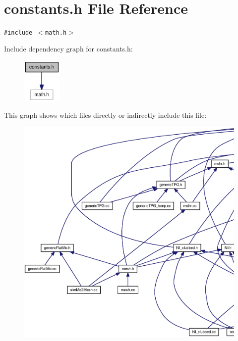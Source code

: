 \section{constants.h File Reference}
\label{constants_8h}
{\tt \#include $<$math.h$>$}\par


Include dependency graph for constants.h:\nopagebreak
\begin{figure}[H]
\begin{center}
\leavevmode
\includegraphics[width=55pt]{constants_8h__incl}
\end{center}
\end{figure}


This graph shows which files directly or indirectly include this file:\nopagebreak
\begin{figure}[H]
\begin{center}
\leavevmode
\includegraphics[width=420pt]{constants_8h__dep__incl}
\end{center}
\end{figure}
